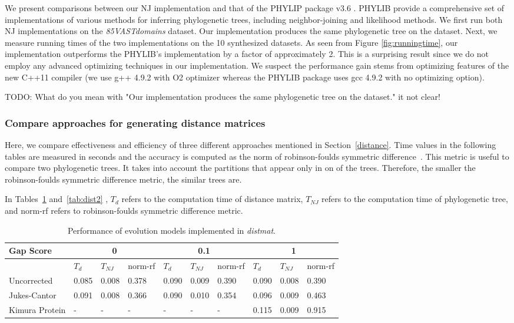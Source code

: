\documentclass[11pt,letterpaper]{article}
\theoremstyle{definition}
\begin{document}
We present comparisons between our NJ implementation and that of the PHYLIP package v3.6 \cite{felsenstein2005phylip}. PHYLIB provide a comprehensive set of implementations of various methods for inferring phylogenetic trees, including neighbor-joining and likelihood methods. We first run both NJ implementations on the \textit{85VASTdomains} dataset. Our implementation produces the same phylogenetic tree on the dataset. Next, we measure running times of the two implementations on the 10 synthesized datasets. As seen from Figure \ref{fig:runningtime}, our implementation outperforms the PHYLIB's implementation by a factor of approximately 2. This is a surprising result since we do not employ any advanced optimizing techniques in our implementation. We suspect the performance gain stems from optimizing features of the new C++11 compiler (we use g++ 4.9.2 with O2 optimizer whereas the PHYLIB package uses gcc 4.9.2 with no optimizing option).  

TODO: What do you mean with "Our implementation produces the same phylogenetic tree on the dataset." it not clear!

\subsubsection{Compare approaches for generating distance matrices}

Here, we compare effectiveness and efficiency of three different approaches mentioned in Section~\ref{distance}. Time values in the following tables are measured in seconds and the accuracy is computed as the norm of robinson-foulds symmetric difference~\cite{robinson1981comparison}. This metric is useful to compare two phylogenetic trees. It takes into account the partitions that appear only in on of the trees. Therefore, the smaller the robinson-foulds symmetric difference metric, the similar trees are.

In Tables~\ref{tab:dist1} and~\ref{tab:dist2} , $T_d$ refers to the computation time of distance matrix, $T_{NJ}$ refers to the computation time of phylogenetic tree, and norm-rf refers to robinson-foulds symmetric difference metric.

\begin{table}[h]
\centering
	\begin{tabular}{l|lll|lll|lll}
Gap Score	& \multicolumn{3}{c}{0} & \multicolumn{3}{c}{0.1} &  \multicolumn{3}{c}{1} \\
\hline
&	$T_d$	& $T_{NJ}$	& norm-rf &	$T_d$	& $T_{NJ}$	& norm-rf &	$T_d$	& $T_{NJ}$	& norm-rf \\
\hline
Uncorrected		&	0.085	&	0.008	&	0.378	&	0.090	&	0.009	&	0.390	&	0.090	&	0.008	&	0.390	\\
Jukes-Cantor	&	0.091	&	0.008	&	0.366	&	0.090	&	0.010	&	0.354	&	0.096	&	0.009	&	0.463	\\
Kimura Protein	&	-	&	-	&	-	&	-	&	-	&	-	&	0.115	&	0.009	&	0.915	\\
\hline
\end{tabular}
\caption{Performance of evolution models implemented in \textit{distmat}.}\label{tab:dist1}
\end{table}
\end{document}
